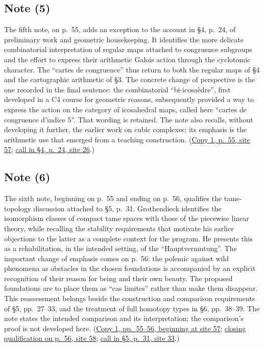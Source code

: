 \documentclass[11pt,a4paper]{article}
\begin{document}
\subsection*{Note (5)}
The fifth note, on p.~55, adds an exception to the account in \S4,
p.~24, of preliminary work and geometric housekeeping. It identifies
the more delicate combinatorial interpretation of regular maps attached
to congruence subgroups and the effort to express their arithmetic
Galois action through the cyclotomic character. The ``cartes de
congruence'' thus return to both the regular maps of \S4 and the
cartographic arithmetic of \S3. The concrete change of perspective is
the one recorded in the final sentence: the combinatorial
``bi-icosaèdre'', first developed in a C4 course for geometric reasons,
subsequently provided a way to express the action on the category of
icosahedral maps, called here ``cartes de congruence d'indice 5''.
That wording is retained. The note also recalls, without developing it
further, the earlier work on cubic complexes; its emphasis is the
arithmetic use that emerged from a teaching construction.
(\href{https://grothendieck.umontpellier.fr/web/viewer.html?file=../119.pdf\#page=58}{Copy 1, p.~55, site 57};
\href{https://grothendieck.umontpellier.fr/web/viewer.html?file=../119.pdf\#page=27}{call in \S4, p.~24, site 26}.)


\subsection*{Note (6)}
The sixth note, beginning on p.~55 and ending on p.~56, qualifies the
tame-topology discussion attached to \S5, p.~31. Grothendieck identifies
the isomorphism classes of compact tame spaces with those of the
piecewise linear theory, while recalling the stability requirements that
motivate his earlier objections to the latter as a complete context for
the program. He presents this as a rehabilitation, in the intended
setting, of the ``Hauptvermutung''. The important change of emphasis
comes on p.~56: the polemic against wild phenomena as obstacles in the
chosen foundations is accompanied by an explicit recognition of their
reason for being and their own beauty. The proposed foundations are to
place them as ``cas limites'' rather than make them disappear. This
reassessment belongs beside the construction and comparison requirements
of \S5, pp.~27--33, and the treatment of full homotopy types in \S6,
pp.~38--39. The note states the intended comparison and its interpretation;
the comparison's proof is not developed here.
(\href{https://grothendieck.umontpellier.fr/web/viewer.html?file=../119.pdf\#page=58}{Copy 1, pp.~55--56, beginning at site 57};
\href{https://grothendieck.umontpellier.fr/web/viewer.html?file=../119.pdf\#page=59}{closing qualification on p.~56, site 58};
\href{https://grothendieck.umontpellier.fr/web/viewer.html?file=../119.pdf\#page=34}{call in \S5, p.~31, site 33}.)
\end{document}
